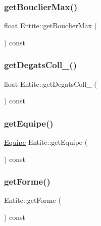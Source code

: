 \mbox{\label{class_entite_adecf490f77d783aa9492eb833b307939}} 
\subsubsection{\texorpdfstring{get\+Bouclier\+Max()}{getBouclierMax()}}
{\footnotesize\ttfamily float Entite\+::get\+Bouclier\+Max (\begin{DoxyParamCaption}{ }\end{DoxyParamCaption}) const\hspace{0.3cm}{\ttfamily [inline]}}

\mbox{\label{class_entite_a57bef183cc6104b6b7b8a2048880552f}} 
\subsubsection{\texorpdfstring{get\+Degats\+Coll\+\_\+()}{getDegatsColl\_()}}
{\footnotesize\ttfamily float Entite\+::get\+Degats\+Coll\+\_\+ (\begin{DoxyParamCaption}{ }\end{DoxyParamCaption}) const}

\mbox{\label{class_entite_a44612e23e1c45af3e865fa039875df1e}} 
\subsubsection{\texorpdfstring{get\+Equipe()}{getEquipe()}}
{\footnotesize\ttfamily \mbox{\hyperlink{constantes_8h_a08fa5554288d5031a8f3bb83cc04ee83}{Equipe}} Entite\+::get\+Equipe (\begin{DoxyParamCaption}{ }\end{DoxyParamCaption}) const\hspace{0.3cm}{\ttfamily [inline]}}

\mbox{\label{class_entite_ad7314f276ea1808e98cfd8b7d0e900c8}} 
\subsubsection{\texorpdfstring{get\+Forme()}{getForme()}}
{\footnotesize\ttfamily Entite\+::get\+Forme (\begin{DoxyParamCaption}{ }\end{DoxyParamCaption}) const\hspace{0.3cm}{\ttfamily [inline]}}



